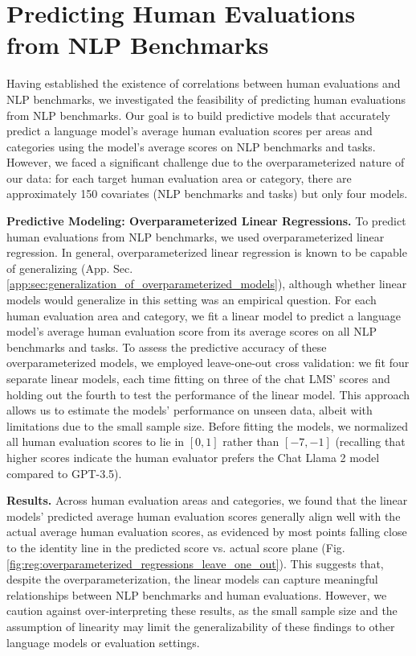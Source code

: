 \section{Predicting Human Evaluations from NLP Benchmarks}
\label{sec:predictions}

Having established the existence of correlations between human evaluations and NLP benchmarks, we investigated the feasibility of predicting human evaluations from NLP benchmarks. Our goal is to build predictive models that accurately predict a language model's average human evaluation scores per areas and categories using the model's average scores on NLP benchmarks and tasks. However, we faced a significant challenge due to the overparameterized nature of our data: for each target human evaluation area or category, there are approximately 150 covariates (NLP benchmarks and tasks) but only four models.


\textbf{Predictive Modeling: Overparameterized Linear Regressions.}
To predict human evaluations from NLP benchmarks, we used overparameterized linear regression. In general, overparameterized linear regression is known to be capable of generalizing (App. Sec. \ref{app:sec:generalization_of_overparameterized_models}), although whether linear models would generalize in this setting was an empirical question. 
For each human evaluation area and category, we fit a linear model to predict a language model's average human evaluation score from its average scores on all NLP benchmarks and tasks. To assess the predictive accuracy of these overparameterized models, we employed leave-one-out cross validation: we fit four separate linear models, each time fitting on three of the chat LMS' scores and holding out the fourth to test the performance of the linear model. This approach allows us to estimate the models' performance on unseen data, albeit with limitations due to the small sample size.
Before fitting the models, we normalized all human evaluation scores to lie in $[0, 1]$ rather than $[-7, -1]$ (recalling that higher scores indicate the human evaluator prefers the Chat Llama 2 model compared to GPT-3.5). 

\textbf{Results.} Across human evaluation areas and categories, we found that the linear models' predicted average human evaluation scores generally align well with the actual average human evaluation scores, as evidenced by most points falling close to the identity line in the predicted score vs. actual score plane (Fig. \ref{fig:reg:overparameterized_regressions_leave_one_out}). This suggests that, despite the overparameterization, the linear models can capture meaningful relationships between NLP benchmarks and human evaluations. However, we caution against over-interpreting these results, as the small sample size and the assumption of linearity may limit the generalizability of these findings to other language models or evaluation settings.


